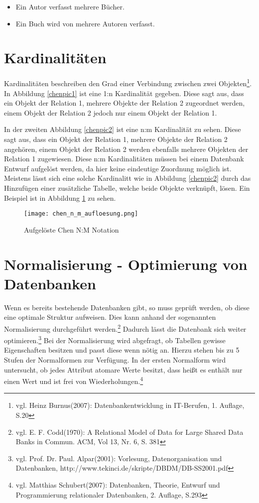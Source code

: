 \begin{itemize}
\item Ein Autor verfasst mehrere Bücher.
\item Ein Buch wird von mehrere Autoren verfasst.
\end{itemize}



\section{Kardinalitäten}

Kardinalitäten beschreiben den Grad einer Verbindung zwischen zwei Objekten\footnote{vgl. Heinz Burnus(2007): Datenbankentwicklung in IT-Berufen, 1. Auflage, S.20}.
In Abbildung \ref{chenpic1} ist eine 1:n Kardinalität gegeben.
Diese sagt aus, dass ein Objekt der Relation 1, mehrere Objekte der Relation 2 zugeordnet werden, einem Objekt der Relation 2 jedoch nur einem Objekt der Relation 1.

In der zweiten Abbildung \ref{chenpic2} ist eine n:m Kardinalität zu sehen.
Diese sagt aus, dass ein Objekt der Relation 1, mehrere Objekte der Relation 2 angehören, einem Objekt der Relation 2 werden ebenfalls mehrere Objekten der Relation 1 zugewiesen.
Diese n:m Kardinalitäten müssen bei einem Datenbank Entwurf aufgelöst werden, da hier keine eindeutige Zuordnung möglich ist. Meistens lässt sich eine solche Kardinalitt wie in Abbildung \ref{chenpic2} durch das Hinzufügen einer zusätzliche Tabelle, welche beide Objekte verknüpft, lösen.
Ein Beispiel ist in Abbildung \ref{chenpic3} zu sehen.

\begin{figure}[H]
\begin{center}
\texttt{[image: chen\_n\_m\_aufloesung.png]}
\caption{Aufgelöste Chen N:M Notation}
\label{chenpic3}
\end{center}
\end{figure}

\section{Normalisierung - Optimierung von Datenbanken}
\label{secNormalisierung}
Wenn es bereits bestehende Datenbanken gibt, so muss geprüft werden, ob diese eine optimale Struktur aufweisen. Dies kann anhand der sogenannten Normalisierung durchgeführt werden.\footnote{vgl. E. F. Codd(1970): A Relational Model of Data for Large Shared Data Banks in Commun. ACM, Vol 13, Nr. 6, S. 381} Dadurch lässt die Datenbank sich weiter optimieren.\footnote{vgl. Prof. Dr. Paul. Alpar(2001): Vorlesung, Datenorganisation und Datenbanken,  http://www.tekinci.de/skripte/DBDM/DB-SS2001.pdf}
Bei der Normalisierung wird abgefragt, ob Tabellen gewisse Eigenschaften besitzen und passt diese wenn nötig an.
Hierzu stehen bis zu 5 Stufen der Normalformen zur Verfügung.
In der ersten Normalform wird untersucht, ob jedes Attribut atomare Werte besitzt, dass heißt es enthält nur einen Wert und ist frei von Wiederholungen.\footnote{vgl. Matthias Schubert(2007): Datenbanken, Theorie, Entwurf und Programmierung relationaler Datenbanken, 2. Auflage, S.293}


